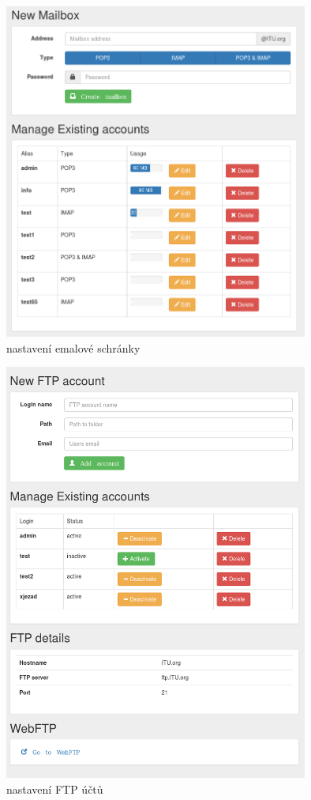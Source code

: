 \documentclass[11pt,a4paper]{article}
\begin{document}
    \begin{figure}[ht]
      \begin{center}
        \includegraphics[width=10cm]{email}
        \caption{nastavení emalové schránky}
      \end{center}
    \end{figure}

    \begin{figure}[ht]
      \begin{center}
        \includegraphics[width=10cm]{ftp}
        \caption{nastavení FTP účtů}
      \end{center}
    \end{figure}
\end{document}
